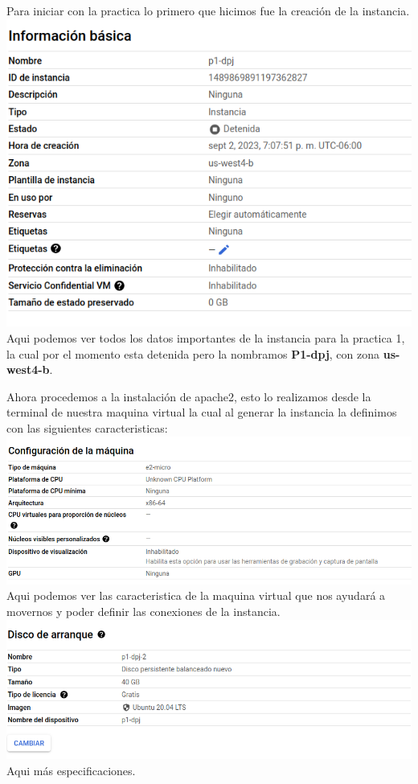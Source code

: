 \documentclass[12pt]{article}
\begin{document}
Para iniciar con la practica lo primero que hicimos fue la creación de la instancia.\\
\textbf{\includegraphics[scale = 0.40]{images/instancia de p1.png}}\\
Aqui podemos ver todos los datos importantes de la instancia para la practica 1, la cual por el momento esta detenida pero la nombramos \textbf{P1-dpj}, con zona \textbf{us-west4-b}. 
\vspace{2em}

Ahora procedemos a la instalación de apache2, esto lo realizamos desde la terminal de nuestra maquina virtual la cual al generar la instancia la definimos con las siguientes caracteristicas:\\
\textbf{\includegraphics[scale = 0.40]{images/maquina virtual.png}}\\
Aqui podemos ver las caracteristica de la maquina virtual que nos ayudará a movernos y poder definir las conexiones de la instancia.\\

\textbf{\includegraphics[scale = 0.40]{images/disco.png}}\\
Aqui más especificaciones.\\
\end{document}
